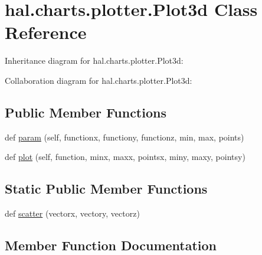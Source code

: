 \hypertarget{classhal_1_1charts_1_1plotter_1_1_plot3d}{}\section{hal.\+charts.\+plotter.\+Plot3d Class Reference}
\label{classhal_1_1charts_1_1plotter_1_1_plot3d}


Inheritance diagram for hal.\+charts.\+plotter.\+Plot3d\+:


Collaboration diagram for hal.\+charts.\+plotter.\+Plot3d\+:
\subsection*{Public Member Functions}
\begin{DoxyCompactItemize}
\item 
def \hyperlink{classhal_1_1charts_1_1plotter_1_1_plot3d_acbc65e1bdff5440a853c4d5c331907af}{param} (self, functionx, functiony, functionz, min, max, points)
\item 
def \hyperlink{classhal_1_1charts_1_1plotter_1_1_plot3d_a56f281f0b9fb9a0f37247c5a0f4791df}{plot} (self, function, minx, maxx, pointsx, miny, maxy, pointsy)
\end{DoxyCompactItemize}
\subsection*{Static Public Member Functions}
\begin{DoxyCompactItemize}
\item 
def \hyperlink{classhal_1_1charts_1_1plotter_1_1_plot3d_a70697dd4170ed79cf48d0835b8e38a29}{scatter} (vectorx, vectory, vectorz)
\end{DoxyCompactItemize}


\subsection{Member Function Documentation}
